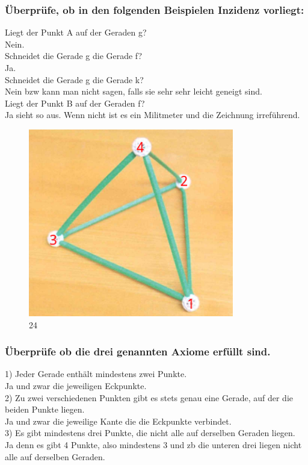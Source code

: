 \documentclass[12pt,a4paper]{article}
\begin{document}
\subsubsection*{Überprüfe, ob in den folgenden Beispielen Inzidenz vorliegt:}
\noindent Liegt der Punkt A auf der Geraden g?\\ 
Nein. \\
Schneidet die Gerade g die Gerade f?\\
Ja. \\
Schneidet die Gerade g die Gerade k?\\ 
Nein bzw kann man nicht sagen, falls sie sehr sehr leicht geneigt sind. \\
Liegt der Punkt B auf der Geraden f?\\ 
Ja sieht so aus. Wenn nicht ist es ein Militmeter und die Zeichnung irreführend.\\

\newpage
\begin{figure}[htbp]     
    \centering             
    \includegraphics[width=0.8\textwidth]{Tetraeder.png}     
    \caption{24}     
    \label{fig:24} 
\end{figure}
\subsubsection*{Überprüfe ob die drei genannten Axiome erfüllt sind.}
1) Jeder Gerade enthält mindestens zwei Punkte.\\
Ja und zwar die jeweiligen Eckpunkte.\\
2) Zu zwei verschiedenen Punkten gibt es stets genau eine Gerade, auf der die beiden Punkte liegen.\\
Ja und zwar die jeweilige Kante die die Eckpunkte verbindet.\\
3) Es gibt mindestens drei Punkte, die nicht alle auf derselben Geraden liegen.\\
Ja denn es gibt 4 Punkte, also mindestens 3 und zb die unteren drei liegen nicht alle auf derselben Geraden.\\
\end{document}
